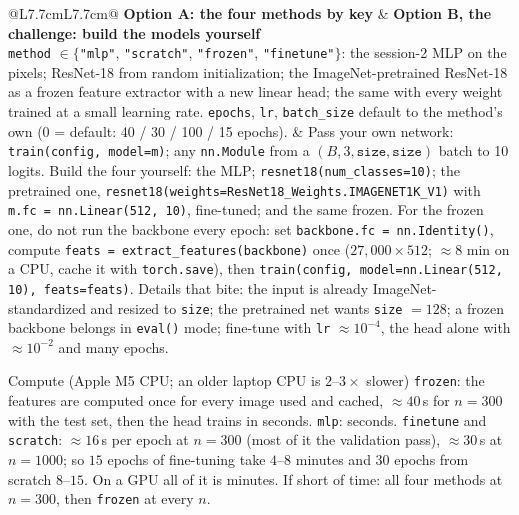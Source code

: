 \documentclass[11pt]{article}
\newcommand{\code}[1]{\texttt{#1}}
\begin{document}
\begin{center}\small
\begin{tabular}{@{}L{7.7cm}L{7.7cm}@{}}
\toprule
\textbf{Option A: the four methods by key} & \textbf{Option B, the challenge: build the models yourself} \\
\midrule
\code{method} $\in\{$\code{"mlp"}, \code{"scratch"}, \code{"frozen"}, \code{"finetune"}$\}$: the session-2 MLP on the pixels; ResNet-18 from random initialization; the ImageNet-pretrained ResNet-18 as a frozen feature extractor with a new linear head; the same with every weight trained at a small learning rate. \code{epochs}, \code{lr}, \code{batch\_size} default to the method's own ($0$ = default: 40 / 30 / 100 / 15 epochs). &
Pass your own network: \code{train(config, model=m)}; any \code{nn.Module} from a $(B,3,\code{size},\code{size})$ batch to 10 logits. Build the four yourself: the MLP; \code{resnet18(num\_classes=10)}; the pretrained one, \code{resnet18(weights=\allowbreak ResNet18\_Weights.\allowbreak IMAGENET1K\_V1)} with \code{m.fc = nn.Linear(512, 10)}, fine-tuned; and the same frozen. For the frozen one, do not run the backbone every epoch: set \code{backbone.fc = nn.Identity()}, compute \code{feats = extract\_features(backbone)} once ($27{,}000\times512$; $\approx8$ min on a CPU, cache it with \code{torch.save}), then \code{train(config, model=nn.Linear(512, 10), feats=feats)}. Details that bite: the input is already ImageNet-standardized and resized to \code{size}; the pretrained net wants \code{size} $=128$; a frozen backbone belongs in \code{eval()} mode; fine-tune with \code{lr} $\approx10^{-4}$, the head alone with $\approx10^{-2}$ and many epochs. \\
\bottomrule
\end{tabular}
\end{center}

\begin{rules}{Compute (Apple M5 CPU; an older laptop CPU is $2$--$3\times$ slower)}
\code{frozen}: the features are computed once for every image used and cached, $\approx40$\,s for $n=300$ with the test set, then the head trains in seconds. \code{mlp}: seconds. \code{finetune} and \code{scratch}: $\approx16$\,s per epoch at $n=300$ (most of it the validation pass), $\approx30$\,s at $n=1000$; so $15$ epochs of fine-tuning take $4$--$8$ minutes and $30$ epochs from scratch $8$--$15$. On a GPU all of it is minutes. If short of time: all four methods at $n=300$, then \code{frozen} at every $n$.
\end{rules}
\end{document}
